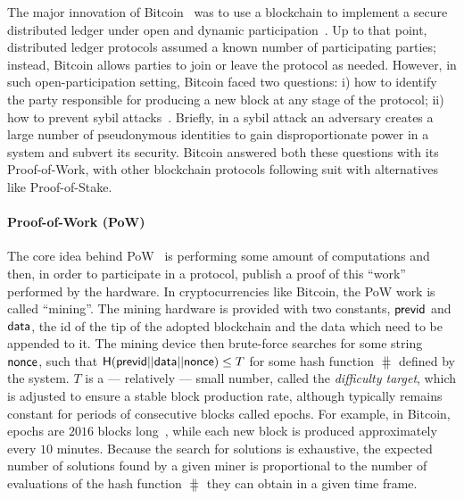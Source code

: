 The major innovation of Bitcoin~\cite{nakamoto2008bitcoin} was to use a
blockchain to implement a secure distributed ledger under open and dynamic
participation~\cite{EC:GarKiaLeo15,C:GarKiaLeo17,EC:PasSeeShe17}. Up to that
point, distributed ledger
protocols assumed a known number of participating parties; instead, Bitcoin
allows parties to join or leave the protocol as needed. However, in such
open-participation setting, Bitcoin faced two questions: i) how to identify the
party responsible for producing a new block at any stage of the protocol; ii)
how to prevent sybil attacks~\cite{douceur2002sybil}. Briefly, in a sybil
attack an adversary creates a large number of pseudonymous identities to gain
disproportionate power in a system and subvert its security. Bitcoin answered
both these questions with its Proof-of-Work, with other blockchain protocols
following suit with alternatives like Proof-of-Stake.

\paragraph{Proof-of-Work (PoW)}
The core idea behind PoW~\cite{C:DwoNao92} is performing some amount of
computations and then, in order to participate in a protocol, publish a proof
of this ``work'' performed by the hardware. In cryptocurrencies like Bitcoin,
the PoW work is called ``mining''. The mining hardware is provided with two
constants, $\mathsf{previd}$ and $\mathsf{data}$, \ie the id of the tip of the
adopted blockchain and the data which need to be appended to it. The mining
device then brute-force searches for some string $\mathsf{nonce}$, such that
$\mathsf{H}(\mathsf{previd} || \mathsf{data} || \mathsf{nonce}) \leq T$ for some hash
function $\hash$ defined by the system. $T$ is a --- relatively --- small
number, called the \emph{difficulty target}, which is adjusted to ensure a
stable block production rate, although typically remains constant for periods
of consecutive blocks called epochs. For example, in Bitcoin, epochs are $2016$
blocks long~\cite{SP:BMCNKF15}, while each new block is produced approximately
every $10$ minutes. Because the search for solutions is exhaustive, the
expected number of solutions found by a given miner is proportional to the
number of evaluations of the hash function $\hash$ they can obtain in a given
time frame.


